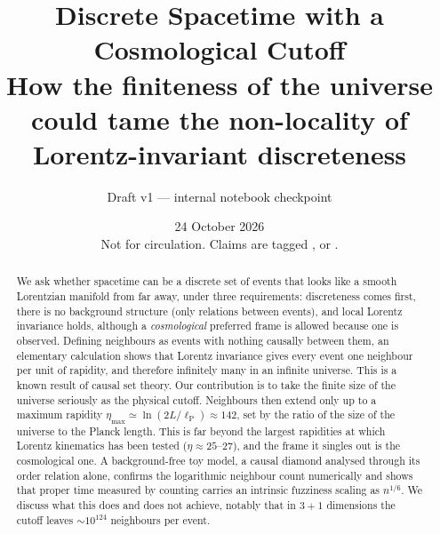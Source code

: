 \documentclass[11pt,a4paper]{article}
\title{Discrete Spacetime with a Cosmological Cutoff\\[4pt]
\large How the finiteness of the universe could tame the non-locality of Lorentz-invariant discreteness}
\author{Draft v1 --- internal notebook checkpoint}
\date{24 October 2026\\[2pt]\small Not for circulation. Claims are tagged \est, \lit{} or \ours.}
\newcommand{\lP}{\ell_{\mathrm P}}
\begin{document}
\maketitle

\begin{abstract}
We ask whether spacetime can be a discrete set of events that looks like a smooth Lorentzian manifold from far away, under three requirements: discreteness comes first, there is no background structure (only relations between events), and local Lorentz invariance holds, although a \emph{cosmological} preferred frame is allowed because one is observed. Defining neighbours as events with nothing causally between them, an elementary calculation shows that Lorentz invariance gives every event one neighbour per unit of rapidity, and therefore infinitely many in an infinite universe. This is a known result of causal set theory. Our contribution is to take the finite size of the universe seriously as the physical cutoff. Neighbours then extend only up to a maximum rapidity $\eta_{\max}\simeq\ln(2L/\lP)\approx142$, set by the ratio of the size of the universe to the Planck length. This is far beyond the largest rapidities at which Lorentz kinematics has been tested ($\eta\approx25$--$27$), and the frame it singles out is the cosmological one. A background-free toy model, a causal diamond analysed through its order relation alone, confirms the logarithmic neighbour count numerically and shows that proper time measured by counting carries an intrinsic fuzziness scaling as $n^{1/6}$. We discuss what this does and does not achieve, notably that in $3+1$ dimensions the cutoff leaves $\sim10^{124}$ neighbours per event.
\end{abstract}
\end{document}

